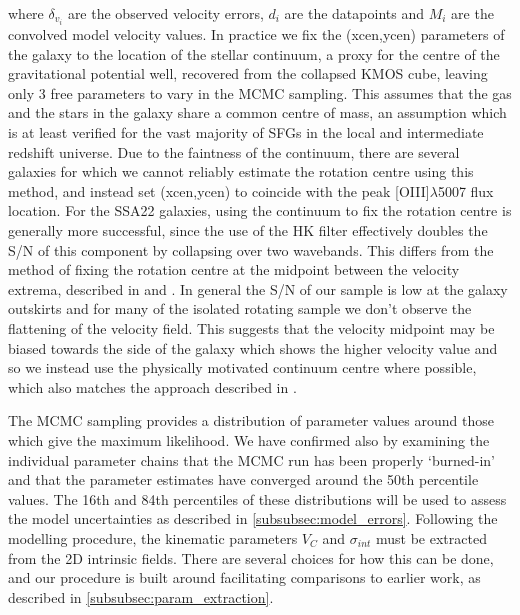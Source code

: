 \documentclass[fleqn,usenatbib]{mn2e}
\begin{document}
\noindent
where $\delta_{v_{i}}$ are the observed velocity errors, $d_{i}$ are the datapoints and $M_{i}$ are the convolved model velocity values.
In practice we fix the (xcen,ycen) parameters of the galaxy to the location of the stellar continuum, a proxy for the centre of the gravitational potential well, recovered from the collapsed KMOS cube, leaving only 3 free parameters to vary in the MCMC sampling.
This assumes that the gas and the stars in the galaxy share a common centre of mass, an assumption which is at least verified for the vast majority of SFGs in the local and intermediate redshift universe.
Due to the faintness of the continuum, there are several galaxies for which we cannot reliably estimate the rotation centre using this method, and instead set (xcen,ycen) to coincide with the peak [OIII]$\lambda$5007 flux location.
For the SSA22 galaxies, using the continuum to fix the rotation centre is generally more successful, since the use of the HK filter effectively doubles the S/N of this component by collapsing over two wavebands.
This differs from the method of fixing the rotation centre at the midpoint between the velocity extrema, described in \cite{Wisnioski2015} and \cite{Rodrigues2016}.
In general the S/N of our sample is low at the galaxy outskirts and for many of the isolated rotating sample we don't observe the flattening of the velocity field.
This suggests that the velocity midpoint may be biased towards the side of the galaxy which shows the higher velocity value and so we instead use the physically motivated continuum centre where possible, which also matches the approach described in \cite{Harrison2017}.

The MCMC sampling provides a distribution of parameter values around those which give the maximum likelihood.
We have confirmed also by examining the individual parameter chains that the MCMC run has been properly `burned-in' and that the parameter estimates have converged around the 50th percentile values.
The 16th and 84th percentiles of these distributions will be used to assess the model uncertainties as described in \cref{subsubsec:model_errors}.
Following the modelling procedure, the kinematic parameters $V_{C}$ and $\sigma_{int}$ must be extracted from the 2D intrinsic fields.
There are several choices for how this can be done, and our procedure is built around facilitating comparisons to earlier work, as described in \cref{subsubsec:param_extraction}. 
\end{document}
